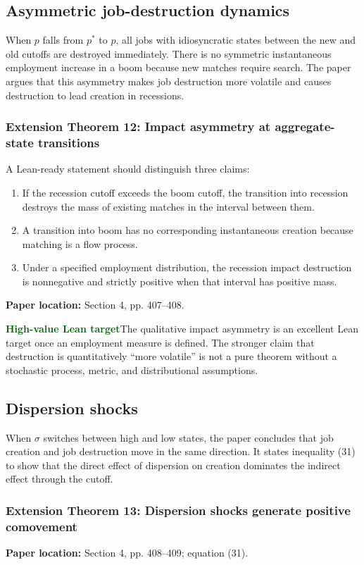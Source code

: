 \documentclass[11pt]{article}
\newcommand{\leanhigh}{\textcolor{darkgreen}{\textbf{High-value Lean target}}}
\newcommand{\papersec}[1]{\textbf{Paper location:} #1}
\newcommand{\statusbox}[2]{\colorbox{#1}{\parbox{0.94\linewidth}{#2}}}
\begin{document}
\subsection{Asymmetric job-destruction dynamics}
When $p$ falls from $p^*$ to $p$, all jobs with idiosyncratic states between the new and old cutoffs are destroyed immediately. There is no symmetric instantaneous employment increase in a boom because new matches require search. The paper argues that this asymmetry makes job destruction more volatile and causes destruction to lead creation in recessions.

\subsubsection*{Extension Theorem 12: Impact asymmetry at aggregate-state transitions}
A Lean-ready statement should distinguish three claims:

\begin{enumerate}
\item If the recession cutoff exceeds the boom cutoff, the transition into recession destroys the mass of existing matches in the interval between them.
\item A transition into boom has no corresponding instantaneous creation because matching is a flow process.
\item Under a specified employment distribution, the recession impact destruction is nonnegative and strictly positive when that interval has positive mass.
\end{enumerate}

\papersec{Section 4, pp. 407--408.}

\statusbox{softgreen}{\leanhigh\quad The qualitative impact asymmetry is an excellent Lean target once an employment measure is defined. The stronger claim that destruction is quantitatively ``more volatile'' is not a pure theorem without a stochastic process, metric, and distributional assumptions.}

\subsection{Dispersion shocks}
When $\sigma$ switches between high and low states, the paper concludes that job creation and job destruction move in the same direction. It states inequality (31) to show that the direct effect of dispersion on creation dominates the indirect effect through the cutoff.

\subsubsection*{Extension Theorem 13: Dispersion shocks generate positive comovement}
\papersec{Section 4, pp. 408--409; equation (31).}
\end{document}
